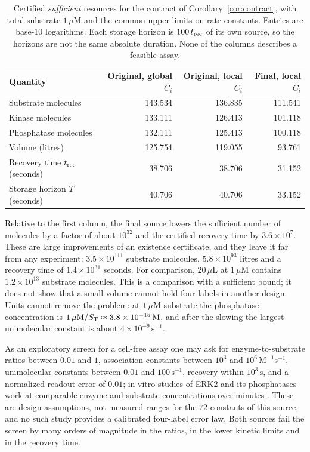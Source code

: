 \begin{table}[tbp]
\centering\small
\caption{Certified \emph{sufficient} resources for the contract of
Corollary~\ref{cor:contract}, with total substrate \(1\,\mu\mathrm M\) and the common upper
limits on rate constants. Entries are base-10 logarithms. Each storage horizon is
\(100\,t_{\mathrm{rec}}\) of its own source, so the horizons are not the same absolute duration. None of
the columns describes a feasible assay.}
\label{tab:resources}
\begin{tabular}{lrrr}
\toprule
Quantity & Original, global \(C_i\) & Original, local \(C_i\) & Final, local \(C_i\)\\
\midrule
Substrate molecules & 143.534 & 136.835 & 111.541\\
Kinase molecules & 133.111 & 126.413 & 101.118\\
Phosphatase molecules & 132.111 & 125.413 & 100.118\\
Volume (litres) & 125.754 & 119.055 & 93.761\\
Recovery time \(t_{\mathrm{rec}}\) (seconds) & 38.706 & 38.706 & 31.152\\
Storage horizon \(T\) (seconds) & 40.706 & 40.706 & 33.152\\
\bottomrule
\end{tabular}
\end{table}

Relative to the first column, the final source lowers the sufficient number of molecules by a
factor of about \(10^{32}\) and the certified recovery time by \(3.6\times10^{7}\). These are
large improvements of an existence certificate, and they leave it far from any experiment:
\(3.5\times10^{111}\) substrate molecules, \(5.8\times10^{93}\) litres and a recovery time of
\(1.4\times10^{31}\) seconds. For comparison, \(20\,\mu\mathrm L\) at \(1\,\mu\mathrm M\)
contains \(1.2\times10^{13}\) substrate molecules. This is a comparison with a sufficient
bound; it does not show that a small volume cannot hold four labels in another design. Units
cannot remove the problem: at \(1\,\mu\mathrm M\) substrate the phosphatase concentration is
\(1\,\mu\mathrm M/S_{\mathrm T}\approx3.8\times10^{-18}\,\mathrm M\), and after the slowing the largest
unimolecular constant is about \(4\times10^{-9}\,\mathrm s^{-1}\).

As an exploratory screen for a cell-free assay one may ask for enzyme-to-substrate ratios
between \(0.01\) and \(1\), association constants between \(10^{3}\) and
\(10^{6}\,\mathrm M^{-1}\mathrm s^{-1}\), unimolecular constants between \(0.01\) and
\(100\,\mathrm s^{-1}\), recovery within \(10^{3}\,\mathrm s\), and a normalized readout error
of \(0.01\); in vitro studies of ERK2 and its phosphatases work at comparable enzyme and
substrate concentrations over minutes \cite{TaylorERK2019}. These are design assumptions, not
measured ranges for the \(72\) constants of this source, and no such study provides a
calibrated four-label error law. Both sources fail the screen by many orders of magnitude in
the ratios, in the lower kinetic limits and in the recovery time.

